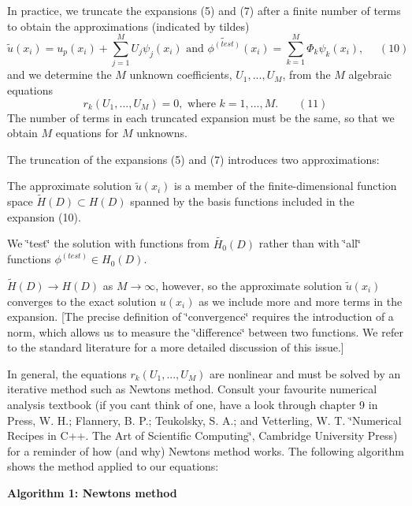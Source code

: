 In practice, we truncate the expansions (5) and (7) after a finite number of terms to obtain the approximations (indicated by tildes) \[ \widetilde{u}(x_i) = u_p(x_i) + \sum_{j=1}^{M} U_j \psi_j(x_i) \mbox{ \ \ and \ \ } \widetilde{\phi^{(test)}}(x_i) = \sum_{k=1}^{M} \Phi_k \psi_k(x_i), \ \ \ \ \ \ (10) \] and we determine the $M$ unknown coefficients, $U_1,...,U_M$, from the $M$ algebraic equations \[ r_k(U_1,...,U_M)=0, \mbox{\ \ where \ \ $k=1,...,M$}. \ \ \ \ \ \ \ \ (11) \] The number of terms in each truncated expansion must be the same, so that we obtain $M$ equations for $M$ unknowns.

The truncation of the expansions (5) and (7) introduces two approximations\+:
\begin{DoxyItemize}
\item The approximate solution $ \widetilde{u}(x_i) $ is a member of the finite-\/dimensional function space $\widetilde{H}(D) \subset H(D)$ spanned by the basis functions included in the expansion (10).
\item We \char`\"{}test\char`\"{} the solution with functions from $ \widetilde{H_{0}}(D) $ rather than with \char`\"{}all\char`\"{} functions $ \phi^{(test)} \in H_0(D). $
\end{DoxyItemize}$\widetilde{H}(D) \to H(D)$ as $M \to \infty$, however, so the approximate solution $\widetilde{u}(x_i)$ converges to the exact solution $u(x_i)$ as we include more and more terms in the expansion. \mbox{[}The precise definition of \char`\"{}convergence\char`\"{} requires the introduction of a norm, which allows us to measure the \char`\"{}difference\char`\"{} between two functions. We refer to the standard literature for a more detailed discussion of this issue.\mbox{]}

In general, the equations $r_k(U_1,...,U_M)$ are nonlinear and must be solved by an iterative method such as Newton\textquotesingle{}s method. Consult your favourite numerical analysis textbook (if you can\textquotesingle{}t think of one, have a look through chapter 9 in Press, W. H.; Flannery, B. P.; Teukolsky, S. A.; and Vetterling, W. T. \char`\"{}\+Numerical Recipes in C++.
\+The Art of Scientific Computing\char`\"{}, Cambridge University Press) for a reminder of how (and why) Newton\textquotesingle{}s method works. The following algorithm shows the method applied to our equations\+:

\label{index_Newton}%
%
 \begin{center} {\bfseries  Algorithm 1\+: Newton\textquotesingle{}s method } \end{center} 


